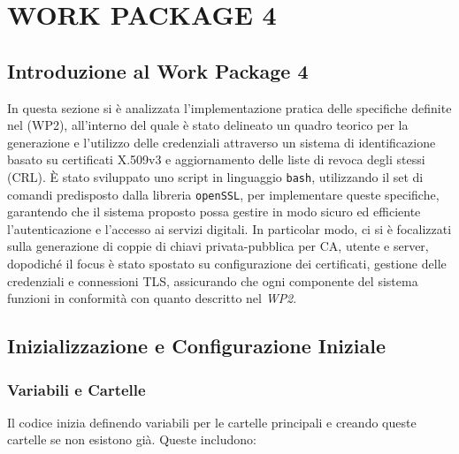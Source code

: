 \chapter{WORK PACKAGE 4}
    \section{Introduzione al Work Package 4}
        In questa sezione si è analizzata l'implementazione pratica delle specifiche definite nel (WP2), all'interno del quale è stato delineato un quadro teorico per la generazione e l'utilizzo delle credenziali attraverso un sistema di identificazione basato su certificati X.509v3 e aggiornamento delle liste di revoca degli stessi (CRL).
        È stato sviluppato uno script in linguaggio \texttt{bash}, utilizzando il set di comandi predisposto dalla libreria \texttt{openSSL}, per implementare queste specifiche, garantendo che il sistema proposto possa gestire in modo sicuro ed efficiente l'autenticazione e l'accesso ai servizi digitali.
        In particolar modo, ci si è focalizzati sulla generazione di coppie di chiavi privata-pubblica per CA, utente e server, dopodiché il focus è stato spostato su configurazione dei certificati, gestione delle credenziali e connessioni TLS, assicurando che ogni componente del sistema funzioni in conformità con quanto descritto nel \textit{WP2}.

    \section{Inizializzazione e Configurazione Iniziale}
        \subsection{Variabili e Cartelle}
            Il codice inizia definendo variabili per le cartelle principali e creando queste cartelle se non esistono già. Queste includono:

